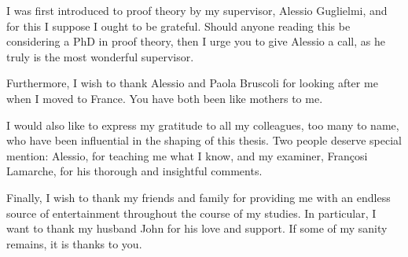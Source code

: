 I was first introduced to proof theory by my supervisor, Alessio Guglielmi, and for this I suppose I ought to be grateful. Should anyone reading this be considering a PhD in proof theory, then I urge you to give Alessio a call, as he truly is the most wonderful supervisor.

Furthermore, I wish to thank Alessio and Paola Bruscoli for looking after me when I moved to France. You have both been like mothers to me.

I would also like to express my gratitude to all my colleagues, too many to name, who have been influential in the shaping of this thesis. Two people deserve special mention: Alessio, for teaching me what I know, and my examiner, Fran\c{c}osi Lamarche, for his thorough and insightful comments.

Finally, I wish to thank my friends and family for providing me with an endless source of entertainment throughout the course of my studies. In particular, I want to thank my husband John for his love and support. If some of my sanity remains, it is thanks to you.
